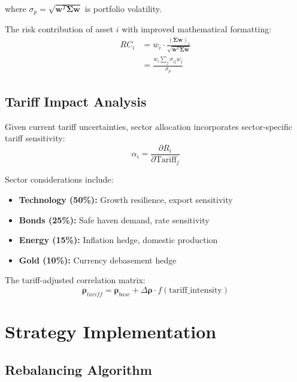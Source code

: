 \documentclass[onecolumn,ieee]{arithmaxresearch}
\begin{document}
where $\sigma_p = \sqrt{\mathbf{w}^T \boldsymbol{\Sigma} \mathbf{w}}$ is portfolio volatility.

The risk contribution of asset $i$ with improved mathematical formatting:
\begin{equation}
\begin{aligned}
RC_i &= w_i \cdot \frac{(\boldsymbol{\Sigma} \mathbf{w})_i}{\sqrt{\mathbf{w}^T \boldsymbol{\Sigma} \mathbf{w}}} \\
&= \frac{w_i \sum_j \sigma_{ij}w_j}{\sigma_p}
\end{aligned}
\end{equation}

\subsection{Tariff Impact Analysis}

Given current tariff uncertainties, sector allocation incorporates sector-specific tariff sensitivity:
\begin{equation}
\alpha_i = \frac{\partial R_i}{\partial \text{Tariff}_j}
\end{equation}

Sector considerations include:
\begin{itemize}
    \item \textbf{Technology (50\%):} Growth resilience, export sensitivity
    \item \textbf{Bonds (25\%):} Safe haven demand, rate sensitivity  
    \item \textbf{Energy (15\%):} Inflation hedge, domestic production
    \item \textbf{Gold (10\%):} Currency debasement hedge
\end{itemize}

The tariff-adjusted correlation matrix:
\begin{equation}
\boldsymbol{\rho}_{tariff} = \boldsymbol{\rho}_{base} + \Delta \boldsymbol{\rho} \cdot f(\text{tariff\_intensity})
\end{equation}

\section{Strategy Implementation}

\subsection{Rebalancing Algorithm}
\end{document}
